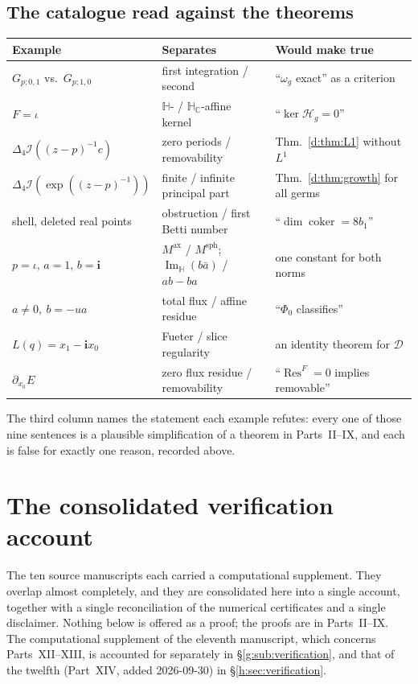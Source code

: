 \documentclass[11pt,a4paper]{article}
\numberwithin{equation}{section}
\theoremstyle{definition}
\theoremstyle{remark}
\theoremstyle{plain}
\newcommand{\HH}{\mathbb H}
\newcommand{\HC}{\mathbb H_{\mathbb C}}
\DeclareMathOperator{\Ima}{Im}
\newcommand{\ImH}{\Ima_{\HH}}
\newcommand{\Dop}{\mathcal D}
\newcommand{\lap}{\Delta_4}
\newcommand{\I}{\mathcal I}
\newcommand{\om}{\omega}
\newcommand{\Hg}{\mathcal H_{g}}      %
\newcommand{\Msph}{M^{\mathrm{sph}}}                  %
\newcommand{\Max}{M^{\mathrm{ax}}}                    %
\newcommand{\Res}{\operatorname{Res}}
\begin{document}
\subsection{The catalogue read against the theorems}

\begin{center}
\footnotesize
\renewcommand{\arraystretch}{1.3}
\begin{tabular}{@{}l l l@{}}
\toprule
Example & Separates & Would make true\\
\midrule
$G_{p;0,1}$ vs.\ $G_{p;1,0}$ &
first integration / second &
``$\om_g$ exact'' as a criterion\\
$F=\iota$ &
$\HH$- / $\HC$-affine kernel &
``$\ker\Hg=0$''\\
$\lap\I((z-p)^{-1}c)$ &
zero periods / removability &
Thm.~\ref{d:thm:L1} without $L^1$\\
$\lap\I(\exp((z-p)^{-1}))$ &
finite / infinite principal part &
Thm.~\ref{d:thm:growth} for all germs\\
shell, deleted real points &
obstruction / first Betti number &
``$\dim\operatorname{coker}=8b_1$''\\
$p=\iota,\,a=1,\,b=\mathbf i$ &
$\Max$ / $\Msph$; $\ImH(b\bar a)$ / $ab-ba$ &
one constant for both norms\\
$a\ne0,\ b=-ua$ &
total flux / affine residue &
``$\Phi_0$ classifies''\\
$L(q)=x_1-\mathbf i x_0$ &
Fueter / slice regularity &
an identity theorem for $\Dop$\\
$\partial_{x_0}E$ &
zero flux residue / removability &
``$\Res^F=0$ implies removable''\\
\bottomrule
\end{tabular}
\end{center}

The third column names the statement each example refutes: every one of
those nine sentences is a plausible simplification of a theorem in
Parts~II--IX, and each is false for exactly one reason, recorded above.

\section{The consolidated verification account}
\label{f:sec:verification}

The ten source manuscripts each carried a computational supplement. They
overlap almost completely, and they are consolidated here into a single
account, together with a single reconciliation of the numerical
certificates and a single disclaimer. Nothing below is offered as a proof;
the proofs are in Parts~II--IX. The computational supplement of the eleventh
manuscript, which concerns Parts~XII--XIII, is accounted for separately in
\S\ref{g:sub:verification}, and that of the twelfth (Part~XIV, added
2026-09-30) in \S\ref{h:sec:verification}.
\end{document}
